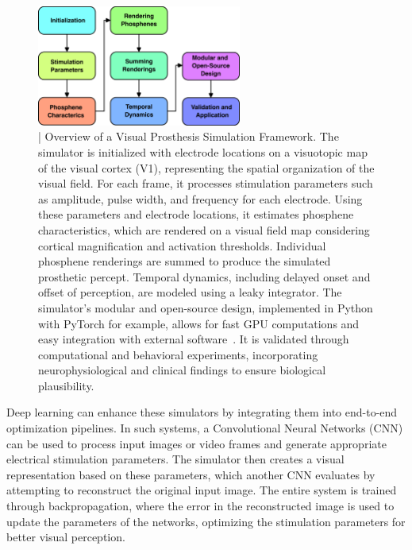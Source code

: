 \documentclass[10pt]{article}
\begin{document}
\begin{figure}[ht!]
  \centering
  \includegraphics[width=0.6\textwidth]{imgs/block_diagram_vis_prost.png}
  \caption{| Overview of a Visual Prosthesis Simulation Framework. The
    simulator is initialized with electrode locations on a visuotopic
    map of the visual cortex (V1), representing the spatial organization
    of the visual field. For each frame, it processes stimulation
    parameters such as amplitude, pulse width, and frequency for each
    electrode. Using these parameters and electrode locations, it
    estimates phosphene characteristics, which are rendered on a visual
    field map considering cortical magnification and activation
    thresholds. Individual phosphene renderings are summed to produce
    the simulated prosthetic percept. Temporal dynamics, including
    delayed onset and offset of perception, are modeled using a leaky
    integrator. The simulator's modular and open-source design,
    implemented in Python with PyTorch for example, allows for fast GPU
    computations and easy integration with external
    software~\parencite{deruytervansteveninckEndtoendOptimizationProsthetic2022}.
    It is validated through computational and behavioral experiments,
    incorporating neurophysiological and clinical findings to ensure
    biological plausibility.}\label{fig:simulator_framework}
\end{figure}

Deep learning can enhance these simulators by integrating them into end-to-end
optimization pipelines. In such systems, a Convolutional Neural Networks (CNN)
can be used to process input images or video frames and generate appropriate
electrical stimulation parameters. The simulator then creates a visual
representation based on these parameters, which another CNN evaluates by
attempting to reconstruct the original input image. The entire system is trained
through backpropagation, where the error in the reconstructed image is used to
update the parameters of the networks, optimizing the stimulation parameters for
better visual perception.
\end{document}
